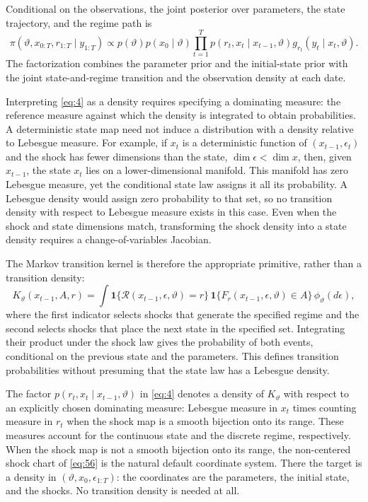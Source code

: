 \documentclass[11pt]{article}
\begin{document}
Conditional on the observations, the joint posterior over parameters, the state trajectory, and the regime path is
\begin{equation}\label{eq:4}
 \pi(\vartheta,x_{0:T},r_{1:T}\mid y_{1:T})
 \propto p(\vartheta)p(x_0\mid\vartheta)
 \prod_{t=1}^T p(r_t,x_t\mid x_{t-1},\vartheta)
 g_{r_t}(y_t\mid x_t,\vartheta).
\end{equation}
The factorization combines the parameter prior and the initial-state prior with the joint state-and-regime transition and the observation density at each date.

Interpreting \eqref{eq:4} as a density requires specifying a dominating measure: the reference measure against which the density is integrated to obtain probabilities. A deterministic state map need not induce a distribution with a density relative to Lebesgue measure. For example, if \(x_t\) is a deterministic function of \((x_{t-1},\epsilon_t)\) and the shock has fewer dimensions than the state, \(\dim\epsilon<\dim x\), then, given \(x_{t-1}\), the state \(x_t\) lies on a lower-dimensional manifold. This manifold has zero Lebesgue measure, yet the conditional state law assigns it all its probability. A Lebesgue density would assign zero probability to that set, so no transition density with respect to Lebesgue measure exists in this case. Even when the shock and state dimensions match, transforming the shock density into a state density requires a change-of-variables Jacobian.

The Markov transition kernel is therefore the appropriate primitive, rather than a transition density:
\begin{equation}\label{eq:4a}
 K_\vartheta(x_{t-1},A,r)
 =\int \mathbf 1\{\mathcal R(x_{t-1},\epsilon,\vartheta)=r\}\,
       \mathbf 1\{F_r(x_{t-1},\epsilon,\vartheta)\in A\}\,
       \phi_\vartheta(d\epsilon),
\end{equation}
where the first indicator selects shocks that generate the specified regime and the second selects shocks that place the next state in the specified set. Integrating their product under the shock law gives the probability of both events, conditional on the previous state and the parameters. This defines transition probabilities without presuming that the state law has a Lebesgue density.

The factor \(p(r_t,x_t\mid x_{t-1},\vartheta)\) in \eqref{eq:4} denotes a density of \(K_\vartheta\) with respect to an explicitly chosen dominating measure: Lebesgue measure in \(x_t\) times counting measure in \(r_t\) when the shock map is a smooth bijection onto its range. These measures account for the continuous state and the discrete regime, respectively. When the shock map is not a smooth bijection onto its range, the non-centered shock chart of \eqref{eq:56} is the natural default coordinate system. There the target is a density in \((\vartheta,x_0,\epsilon_{1:T})\): the coordinates are the parameters, the initial state, and the shocks. No transition density is needed at all.
\end{document}
